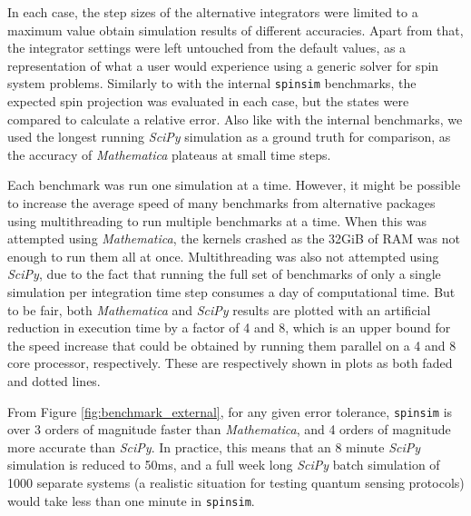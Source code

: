 \documentclass{jors}
\begin{document}
			In each case, the step sizes of the alternative integrators were limited to a maximum value obtain simulation results of different accuracies. Apart from that, the integrator settings were left untouched from the default values, as a representation of what a user would experience using a generic solver for spin system problems. Similarly to with the internal \texttt{spinsim} benchmarks, the expected spin projection was evaluated in each case, but the states were compared to calculate a relative error. Also like with the internal benchmarks, we used the longest running \emph{SciPy} simulation as a ground truth for comparison, as the accuracy of \emph{Mathematica} plateaus at small time steps.

			Each benchmark was run one simulation at a time. However, it might be possible to increase the average speed of many benchmarks from alternative packages using multithreading to run multiple benchmarks at a time. When this was attempted using \emph{Mathematica}, the kernels crashed as the 32GiB of RAM was not enough to run them all at once. Multithreading was also not attempted using \emph{SciPy}, due to the fact that running the full set of benchmarks of only a single simulation per integration time step consumes a day of computational time. But to be fair, both \emph{Mathematica} and \emph{SciPy} results are plotted with an artificial reduction in execution time by a factor of 4 and 8, which is an upper bound for the speed increase that could be obtained by running them parallel on a 4 and 8 core processor, respectively. These are respectively shown in plots as both faded and dotted lines.

			From Figure \ref{fig:benchmark_external}, for any given error tolerance, \texttt{spinsim} is over 3 orders of magnitude faster than \emph{Mathematica}, and 4 orders of magnitude more accurate than \emph{SciPy}. In practice, this means that an 8 minute \emph{SciPy} simulation is reduced to 50ms, and a full week long \emph{SciPy} batch simulation of 1000 separate systems (a realistic situation for testing quantum sensing protocols) would take less than one minute in \texttt{spinsim}.
\end{document}
